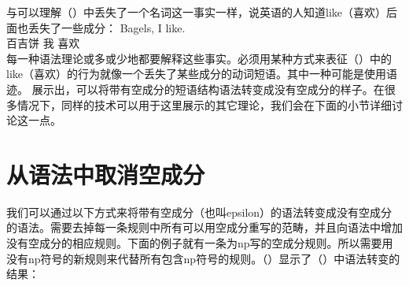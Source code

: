 与可以理解（）中丢失了一个名词这一事实一样，说英语的人知道like（喜欢）后面也丢失了一些成分：
\ea
\gll Bagels, I like.\\
	 百吉饼 我 喜欢\\
\z
每一种语法理论或多或少地都要解释这些事实。必须用某种方式来表征（）中的like（喜欢）的行为就像一个丢失了某些成分的动词短语。其中一种可能是使用语迹。 \citet*[, \S~4.1]{BHPS61a}展示出，可以将带有空成分的短语结构语法转变成没有空成分的样子。在很多情况下，同样的技术可以用于这里展示的其它理论，我们会在下面的小节详细讨论这一点。

\section{从语法中取消空成分}
\label{Abschnitt-Eleminierung-leerer-Elemente}

我们可以通过以下方式来将带有空成分（也叫epsilon）的语法转变成没有空成分的语法。需要去掉每一条规则中所有可以用空成分重写的范畴，并且向语法中增加没有空成分的相应规则。下面的例子就有一条为np写的空成分规则。所以需要用没有np符号的新规则来代替所有包含np符号的规则。（）显示了（）中语法转变的结果：

